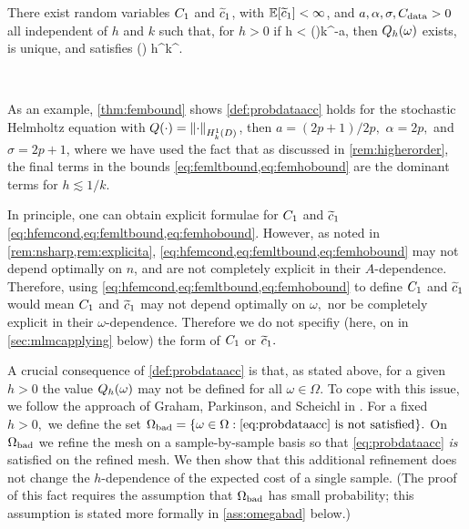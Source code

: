 \label{def:probdataacc}
There exist random variables $C_{1}$ and $\widetilde{c}_{1}$, with $\EXP{\cotilde} < \infty$, and $a, \alpha, \sigma, C_{\mathrm{data}} > 0$ all independent of $h$ and $k$ such that, for $h>0$ if
\beq\label{eq:probdataacc}
h < \Co(\omega)k^{-a},
\eeq
then $Q_{h}(\omega)$ exists, is unique, and satisfies
\beq\label{eq:Qhbound}
 \leq \cotilde(\omega) h^\alpha k^\sigma \Cdata.
\eeq
\eas


\

\bit
\item As an example, \cref{thm:fembound} shows \cref{def:probdataacc} holds for the stochastic Helmholtz equation with $Q(\cdot)=\NHokD{\cdot}$, then $a = (2p+1)/2p,$ $\alpha=2p,$ and $\sigma = 2p+1$, where we have used the fact that as discussed in \cref{rem:higherorder}, the final terms in the bounds \cref{eq:femltbound,eq:femhobound} are the dominant terms for $h \lesssim 1/k.$
  
\item In principle, one can obtain explicit formulae for $C_{1}$ and $\widetilde{c}_{1}$ \cref{eq:hfemcond,eq:femltbound,eq:femhobound}. However, as noted in \cref{rem:nsharp,rem:explicita}, \cref{eq:hfemcond,eq:femltbound,eq:femhobound} may not depend optimally on $n$, and are not completely explicit in their $A$-dependence. Therefore, using \cref{eq:hfemcond,eq:femltbound,eq:femhobound} to define $C_{1}$ and $\widetilde{c}_{1}$ would mean $C_{1}$ and $\widetilde{c}_{1}$ may not depend optimally on $\omega,$ nor be completely explicit in their $\omega$-dependence. Therefore we do not specifiy (here, on in \cref{sec:mlmcapplying} below) the form of $C_{1}$ or $\widetilde{c}_{1}.$


\eit
\ere

A crucial consequence of \cref{def:probdataacc} is that, as stated above, for a given $h>0$ the value $Q_{h}(\omega)$ may not be defined for all $\omega \in \Omega.$ To cope with this issue, we follow the approach of Graham, Parkinson, and Scheichl in \cite{GrPaSc:19}. For a fixed $h>0,$ we define the set $\Omegabad = \set{\omega \in \Omega \st \text{\cref{eq:probdataacc} is not satisfied}}.$ On $\Omega_{\mathrm{bad}}$ we refine the mesh on a sample-by-sample basis so that \cref{eq:probdataacc} \emph{is} satisfied on the refined mesh. We then show that this additional refinement does not change the $h$-dependence of the expected cost of a single sample. (The proof of this fact requires the assumption that $\Omega_{\mathrm{bad}}$ has small probability; this assumption is stated more formally in \cref{ass:omegabad} below.)

